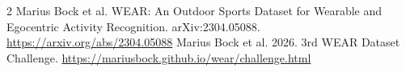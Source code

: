 \documentclass[sigconf,nonacm]{acmart}
\begin{document}
\clearpage
\thispagestyle{empty}
\noindent\begin{minipage}{\columnwidth}
\begin{thebibliography}{2}
 Marius Bock et al. WEAR: An Outdoor Sports Dataset for Wearable and Egocentric Activity Recognition. arXiv:2304.05088. \url{https://arxiv.org/abs/2304.05088}
 Marius Bock et al. 2026. 3rd WEAR Dataset Challenge. \url{https://mariusbock.github.io/wear/challenge.html}
\end{thebibliography}
\end{minipage}
\end{document}
